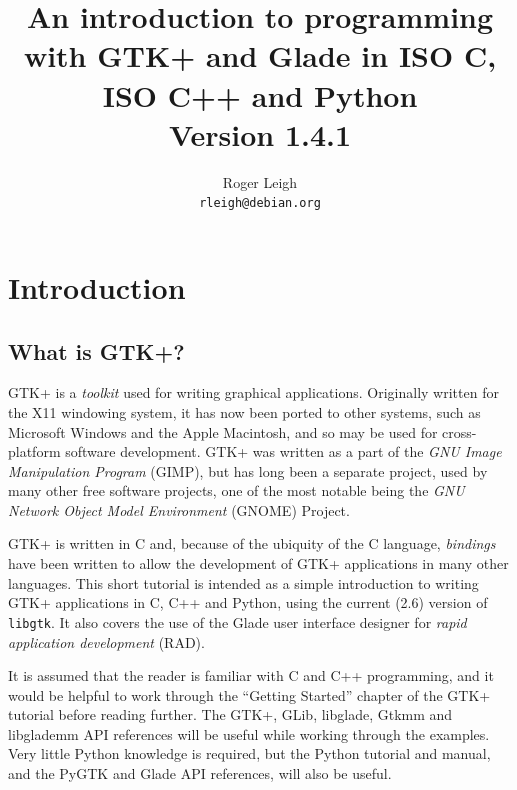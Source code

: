 \documentclass[a4paper,oneside]{article}
\newcommand{\filename}[1]{\texttt{#1}}
\begin{document}
\title{An introduction to programming with GTK+ and Glade in ISO C,
  ISO C++ and Python\\\bigskip\large{Version 1.4.1}}
\author{Roger Leigh\\\texttt{rleigh@debian.org}}
\maketitle

\tableofcontents

\listoffigures

\lstlistoflistings


\section{Introduction}

\subsection{What is GTK+?}

GTK+ is a \emph{toolkit} used for writing graphical applications.
Originally written for the X11 windowing system, it has now been
ported to other systems, such as Microsoft Windows and the Apple
Macintosh, and so may be used for cross-platform software development.
GTK+ was written as a part of the \emph{GNU Image Manipulation
  Program} (GIMP), but has long been a separate project, used by many
other free software projects, one of the most notable being the
\emph{GNU Network Object Model Environment} (GNOME) Project.

GTK+ is written in C and, because of the ubiquity of the C language,
\emph{bindings} have been written to allow the development of GTK+
applications in many other languages.  This short tutorial is intended
as a simple introduction to writing GTK+ applications in C, C++ and
Python, using the current (2.6) version of \filename{libgtk}.  It also
covers the use of the Glade user interface designer for \emph{rapid
  application development} (RAD).

It is assumed that the reader is familiar with C and C++ programming,
and it would be helpful to work through the ``Getting Started''
chapter of the GTK+ tutorial before reading further.  The GTK+, GLib,
libglade, Gtkmm and libglademm API references will be useful while
working through the examples.  Very little Python knowledge is
required, but the Python tutorial and manual, and the PyGTK and Glade
API references, will also be useful.
\end{document}
